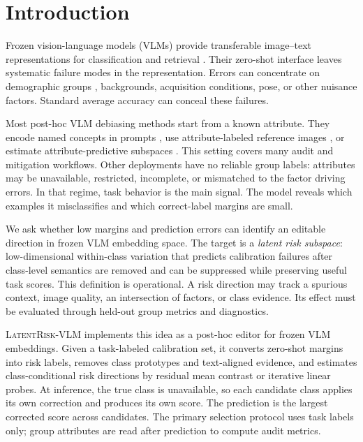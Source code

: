 \section{Introduction}
Frozen vision-language models (VLMs) provide transferable image--text representations for classification and retrieval \citep{radford2021clip}. Their zero-shot interface leaves systematic failure modes in the representation. Errors can concentrate on demographic groups \citep{agarwal2021evaluating,hall2023gender}, backgrounds, acquisition conditions, pose, or other nuisance factors. Standard average accuracy can conceal these failures.

Most post-hoc VLM debiasing methods start from a known attribute. They encode named concepts in prompts \citep{chuang2023debiasing}, use attribute-labeled reference images \citep{gerych2024bendvlm}, or estimate attribute-predictive subspaces \citep{zhao2026subspace}. This setting covers many audit and mitigation workflows. Other deployments have no reliable group labels: attributes may be unavailable, restricted, incomplete, or mismatched to the factor driving errors. In that regime, task behavior is the main signal. The model reveals which examples it misclassifies and which correct-label margins are small.

We ask whether low margins and prediction errors can identify an editable direction in frozen VLM embedding space. The target is a \emph{latent risk subspace}: low-dimensional within-class variation that predicts calibration failures after class-level semantics are removed and can be suppressed while preserving useful task scores. This definition is operational. A risk direction may track a spurious context, image quality, an intersection of factors, or class evidence. Its effect must be evaluated through held-out group metrics and diagnostics.

\textsc{LatentRisk-VLM} implements this idea as a post-hoc editor for frozen VLM embeddings. Given a task-labeled calibration set, it converts zero-shot margins into risk labels, removes class prototypes and text-aligned evidence, and estimates class-conditional risk directions by residual mean contrast or iterative linear probes. At inference, the true class is unavailable, so each candidate class applies its own correction and produces its own score. The prediction is the largest corrected score across candidates. The primary selection protocol uses task labels only; group attributes are read after prediction to compute audit metrics.

